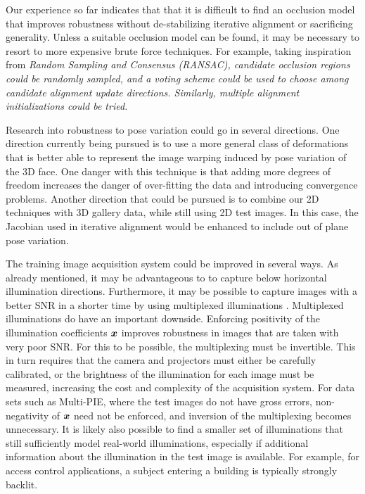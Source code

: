 Our experience so far indicates that that it is difficult to find an occlusion
model that improves robustness without de-stabilizing iterative alignment or
sacrificing generality.  Unless a suitable occlusion model can be found, it may
be necessary to resort to more expensive brute force techniques. For example,
taking inspiration from \em{Random Sampling and Consensus} (RANSAC), candidate
occlusion regions could be randomly sampled, and a voting scheme could be used
to choose among candidate alignment update directions.  Similarly, multiple
alignment initializations could be tried. 

Research into robustness to pose variation could go in several directions.  One
direction currently being pursued is to use a more general class of
deformations that is better able to represent the image warping induced by pose
variation of the 3D face.  One danger with this technique is that adding more
degrees of freedom increases the danger of over-fitting the data and
introducing convergence problems.  Another direction that could be pursued is
to combine our 2D techniques with 3D gallery data, while still using 2D test
images.  In this case, the Jacobian used in iterative alignment would be
enhanced to include out of plane pose variation.

The training image acquisition system could be improved in several ways.  As
already mentioned, it may be advantageous to to capture below horizontal
illumination directions.  Furthermore, it may be possible to capture images
with a better SNR in a shorter time by using multiplexed illuminations
\cite{schechner2007multiplexing}.  Multiplexed illuminations do have an
important downside. Enforcing positivity of the illumination coefficients 
${\boldsymbol{x}}$ improves robustness in images that are taken with very poor SNR.  For this
to be possible, the multiplexing must be invertible.  This in turn requires
that the camera and projectors must either be carefully calibrated, or the
brightness of the illumination for each image must be measured, increasing the
cost and complexity of the acquisition system.  For data sets such as
Multi-PIE, where the test images do not have gross errors, non-negativity of
${\boldsymbol{x}}$ need not be enforced, and inversion of the multiplexing becomes
unnecessary.  It is likely also possible to find a smaller set of illuminations
that still sufficiently model real-world illuminations, especially if
additional
information about the illumination in the test image is available.  For
example, for access control applications, a subject entering a building is
typically strongly backlit.




